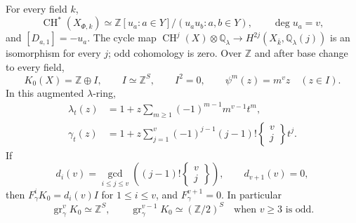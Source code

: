 \begin{proposition}\label{prop:chow-gamma}
For every field $k$,
\[
 \operatorname{CH}^*(X_{\Phi,k})
  \simeq\mathbb Z[u_a:a\in Y]/(u_au_b:a,b\in Y),
 \qquad\deg u_a=v,
\]
and $[D_{a,1}]=-u_a$. The cycle map $\operatorname{CH}^j(X)\otimes\mathbb Q_\lambda\to H^{2j}(X_{\bar k},\mathbb Q_\lambda(j))$ is an isomorphism for every $j$; odd cohomology is zero. Over $\mathbb Z$ and after base change to every field,
\[
 K_0(X)=\mathbb Z\oplus I,\qquad I\simeq\mathbb Z^S,\qquad I^2=0,
 \qquad\psi^m(z)=m^v z\quad(z\in I).
\]
In this augmented $\lambda$-ring,
\begin{align}
 \lambda_t(z)&=1+z\sum_{m\geq1}(-1)^{m-1}m^{v-1}t^m,\\
 \gamma_t(z)&=1+z\sum_{j=1}^v(-1)^{j-1}(j-1)!
                          \left\{\begin{matrix}v\\j\end{matrix}\right\}t^j.
\end{align}
If
\[
 d_i(v)=\gcd_{i\leq j\leq v}
          \left((j-1)!\left\{\begin{matrix}v\\j\end{matrix}\right\}\right),
 \qquad d_{v+1}(v)=0,
\]
then $F_\gamma^iK_0=d_i(v)I$ for $1\leq i\leq v$, and $F_\gamma^{v+1}=0$. In particular
\[
 \operatorname{gr}_\gamma^vK_0\simeq\mathbb Z^S,
 \qquad
 \operatorname{gr}_\gamma^{v-1}K_0\simeq(\mathbb Z/2)^S
 \quad\text{when }v\geq3\text{ is odd}.
\]
\end{proposition}
